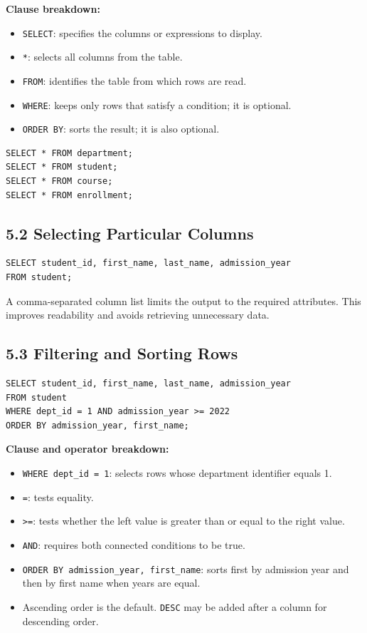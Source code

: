 \documentclass[12pt,a4paper]{article}
\begin{document}
\noindent\textbf{Clause breakdown:}
\begin{itemize}
    \item \texttt{SELECT}: specifies the columns or expressions to display.
    \item \texttt{*}: selects all columns from the table.
    \item \texttt{FROM}: identifies the table from which rows are read.
    \item \texttt{WHERE}: keeps only rows that satisfy a condition; it is optional.
    \item \texttt{ORDER BY}: sorts the result; it is also optional.
\end{itemize}

\begin{verbatim}
SELECT * FROM department;
SELECT * FROM student;
SELECT * FROM course;
SELECT * FROM enrollment;
\end{verbatim}

\subsection*{5.2 Selecting Particular Columns}
\begin{verbatim}
SELECT student_id, first_name, last_name, admission_year
FROM student;
\end{verbatim}

\noindent A comma-separated column list limits the output to the required attributes. This improves
readability and avoids retrieving unnecessary data.

\subsection*{5.3 Filtering and Sorting Rows}
\begin{verbatim}
SELECT student_id, first_name, last_name, admission_year
FROM student
WHERE dept_id = 1 AND admission_year >= 2022
ORDER BY admission_year, first_name;
\end{verbatim}

\noindent\textbf{Clause and operator breakdown:}
\begin{itemize}
    \item \texttt{WHERE dept\_id = 1}: selects rows whose department identifier equals 1.
    \item \texttt{=}: tests equality.
    \item \texttt{>=}: tests whether the left value is greater than or equal to the right value.
    \item \texttt{AND}: requires both connected conditions to be true.
    \item \texttt{ORDER BY admission\_year, first\_name}: sorts first by admission year and then by first name when years are equal.
    \item Ascending order is the default. \texttt{DESC} may be added after a column for descending order.
\end{itemize}
\end{document}
